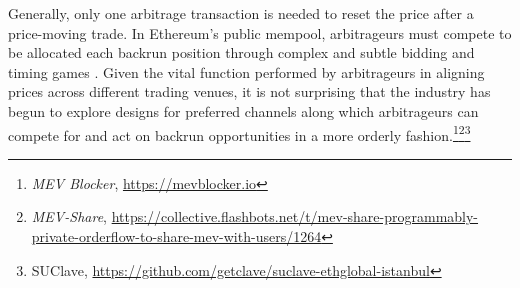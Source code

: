 Generally, only one arbitrage transaction is needed to reset the price after a price-moving trade.
%
In Ethereum's public mempool, arbitrageurs must compete to be allocated each backrun position through complex and subtle bidding and timing games \cite{daian2020flash}.
%
Given the vital function performed by arbitrageurs in aligning prices across different trading venues, it is not surprising that the industry has begun to explore designs for preferred channels along which arbitrageurs can compete for and act on backrun opportunities in a more orderly fashion.\footnote{\emph{MEV Blocker}, \url{https://mevblocker.io}}\footnote{\emph{MEV-Share}, \url{https://collective.flashbots.net/t/mev-share-programmably-private-orderflow-to-share-mev-with-users/1264}}\footnote{SUClave, \url{https://github.com/getclave/suclave-ethglobal-istanbul}}



